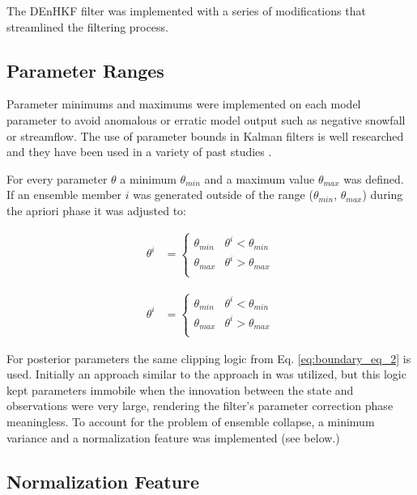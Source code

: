 The DEnHKF filter was implemented with a series of modifications that streamlined the filtering process.

\subsection{Parameter Ranges}

Parameter minimums and maximums were implemented on each model parameter to avoid anomalous or erratic model output such as negative snowfall or streamflow. The use of parameter bounds in Kalman filters is well researched and they have been used in a variety of past studies \cite{Shi2014}.


For every parameter $\theta$ a minimum $\theta_{min}$ and a maximum value $\theta_{max}$ was defined. If an ensemble member $i$ was generated outside of the range ($\theta_{min}$, $\theta_{max}$) during the apriori phase it was adjusted to:



\begin{align}\label{eq:boundary_eq}
\theta^{i} &= \left\{
\begin{array}{ll}
\theta_{min} & \theta^{i} < \theta_{min} \\
\theta_{max} &  \theta^{i} > \theta_{max} \\
\end{array}
\right.
\end{align}

\begin{align}\label{eq:boundary_eq_2}
\theta^{i} &= \left\{
\begin{array}{ll}
\theta_{min} & \theta^{i} < \theta_{min} \\
\theta_{max} &  \theta^{i} > \theta_{max} \\
\end{array}
\right.
\end{align}

For posterior parameters the same clipping logic from Eq. \eqref{eq:boundary_eq_2} is used. Initially an approach similar to the approach in \cite{Shi2014} was utilized, but this logic kept parameters immobile when the innovation between the state and observations were very large, rendering the filter's parameter correction phase  meaningless. To account for the problem of ensemble collapse, a minimum variance and a normalization feature was implemented (see below.)

\subsection{Normalization Feature}

